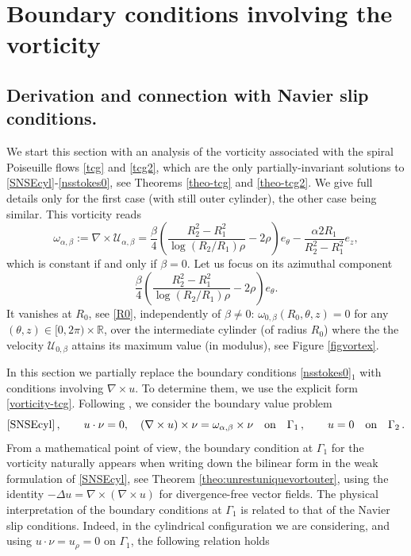 \documentclass[a4paper,11pt]{amsart}
\numberwithin{equation}{section}
\numberwithin{figure}{section}
\newcommand{\R}{\mathbb{R}}
\def\U{{\mathcal U}}
\begin{document}
	
	\section{Boundary conditions involving the vorticity}\label{boundaryvortex}

    \subsection{Derivation and connection with Navier slip conditions.}
	We start this section with an analysis of the vorticity associated with the spiral Poiseuille flows \eqref{tcg} and \eqref{tcg2}, which are the only partially-invariant solutions to \eqref{SNSEcyl}-\eqref{nsstokes0}, see Theorems \ref{theo-tcg} and \ref{theo-tcg2}. We give full details only for the first case (with still outer cylinder), the other case being similar. This vorticity reads
	\begin{equation}\label{vorticity-tcg}
		\omega_{\alpha,\beta}:= \nabla \times  \U_{\alpha,\beta}=\frac{\beta}{4}\left(\frac{R_2^2-R_1^2}{\log(R_2/R_1)\rho}
		-2\rho\right)e_\theta -\frac{\alpha 2R_1}{R_2^2-R_1^2} e_z,
	\end{equation}
	which is constant if and only if $\beta=0$. Let us focus on its azimuthal component
	$$
	\frac{\beta}{4}\left(\frac{R_2^2-R_1^2}{\log(R_2/R_1)\rho}-2\rho\right)e_\theta.
	$$	
	It vanishes at $R_0$, see \eqref{R0},  independently of $\beta\neq 0$:
    $\omega_{0,\beta}(R_0,\theta,z)=0$ for any $(\theta,z)\in[0,2\pi)\times\R$, over the
    intermediate cylinder (of radius $R_0$) where the 
the velocity $\mathcal{U}_{0,\beta}$ attains its maximum value (in modulus), see Figure \ref{figvortex}.\par	
	In this section we partially replace the boundary conditions \eqref{nsstokes0}$_1$ with conditions involving $\nabla \times u$. To determine them, we use the explicit form \eqref{vorticity-tcg}. Following \cite[Section 2.1]{concaenglish},
	we consider the boundary value problem
	\begin{equation}\label{ns-vorti}
		\mbox{\eqref{SNSEcyl}}\, ,\qquad u\cdot \nu =0, \quad (\nabla \times u)\times \nu = \omega_{\alpha,\beta}\times \nu \quad \text{on}\quad \Gamma_1\, ,\qquad u =0\quad \text{on}\quad \Gamma_2\, .
	\end{equation}
From a mathematical point of view, the boundary condition at $\Gamma_1$ for the vorticity naturally appears when writing down the bilinear form in the weak formulation of \eqref{SNSEcyl}, see Theorem \ref{theo:unrestuniquevortouter}, using the identity $-\Delta u =\nabla\times (\nabla \times u)$ for divergence-free vector fields. The physical interpretation of the boundary conditions at $\Gamma_1$ is related to that of the Navier slip conditions. Indeed, in the cylindrical configuration we are considering, and using $u\cdot \nu =u_\rho=0$ on $\Gamma_1$, the following relation holds
\end{document}
